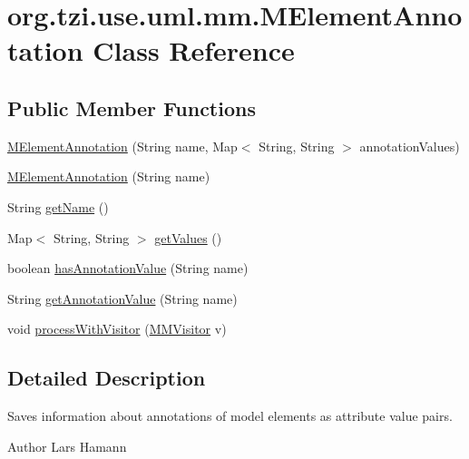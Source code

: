 \hypertarget{classorg_1_1tzi_1_1use_1_1uml_1_1mm_1_1_m_element_annotation}{\section{org.\-tzi.\-use.\-uml.\-mm.\-M\-Element\-Annotation Class Reference}
\label{classorg_1_1tzi_1_1use_1_1uml_1_1mm_1_1_m_element_annotation}
}
\subsection*{Public Member Functions}
\begin{DoxyCompactItemize}
\item 
\hyperlink{classorg_1_1tzi_1_1use_1_1uml_1_1mm_1_1_m_element_annotation_a6d2dc2087de85d0a010e2198798a0539}{M\-Element\-Annotation} (String name, Map$<$ String, String $>$ annotation\-Values)
\item 
\hyperlink{classorg_1_1tzi_1_1use_1_1uml_1_1mm_1_1_m_element_annotation_a1b82cc435eeae6b85d6c25d24f268bfa}{M\-Element\-Annotation} (String name)
\item 
String \hyperlink{classorg_1_1tzi_1_1use_1_1uml_1_1mm_1_1_m_element_annotation_a46ea1a8fb8d8b1b80fa01df9e6d3de03}{get\-Name} ()
\item 
Map$<$ String, String $>$ \hyperlink{classorg_1_1tzi_1_1use_1_1uml_1_1mm_1_1_m_element_annotation_a587974123eaaaa84d348ac10a13d4dad}{get\-Values} ()
\item 
boolean \hyperlink{classorg_1_1tzi_1_1use_1_1uml_1_1mm_1_1_m_element_annotation_a15cf49afc6151d38db3c827ede2a7752}{has\-Annotation\-Value} (String name)
\item 
String \hyperlink{classorg_1_1tzi_1_1use_1_1uml_1_1mm_1_1_m_element_annotation_a2d646539d5a50244031c8d4e1035dd0c}{get\-Annotation\-Value} (String name)
\item 
void \hyperlink{classorg_1_1tzi_1_1use_1_1uml_1_1mm_1_1_m_element_annotation_a15a684ae490b93de97fcd6488e68d4c1}{process\-With\-Visitor} (\hyperlink{interfaceorg_1_1tzi_1_1use_1_1uml_1_1mm_1_1_m_m_visitor}{M\-M\-Visitor} v)
\end{DoxyCompactItemize}


\subsection{Detailed Description}
Saves information about annotations of model elements as attribute value pairs. \begin{DoxyAuthor}{Author}
Lars Hamann 
\end{DoxyAuthor}



